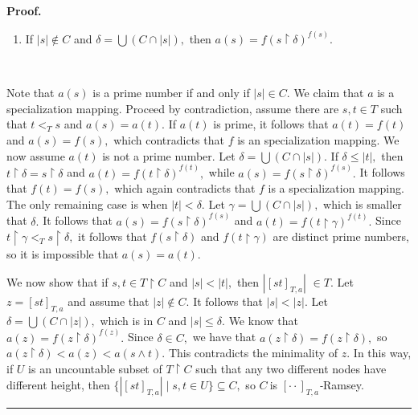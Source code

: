 \documentclass{article}
\newenvironment{proof}[1][Proof]{\noindent\textbf{#1.} }{\ \rule{0.5em}{0.5em}}
\begin{document}
\begin{proof}
\begin{enumerate}
\item If $\left\vert s\right\vert \notin C$ and $\delta=\bigcup\left(
C\cap\left\vert s\right\vert \right)  ,$ then $a\left(  s\right)  =f\left(
s\upharpoonright\delta\right)  ^{f\left(  s\right)  }.$
\end{enumerate}

\qquad\ \ 

Note that $a\left(  s\right)  $ is a prime number if and only if $\left\vert
s\right\vert \in C$. We claim that $a$ is a specialization mapping. Proceed by
contradiction, assume there are $s,t\in T$ such that $t<_{T}s$ and $a\left(
s\right)  =a\left(  t\right)  .$ If $a\left(  t\right)  $ is prime, it follows
that $a\left(  t\right)  =f\left(  t\right)  $ and $a\left(  s\right)
=f\left(  s\right)  ,$ which contradicts that $f$ is an specialization
mapping. We now assume $a\left(  t\right)  $ is not a prime number. Let
$\delta=\bigcup\left(  C\cap\left\vert s\right\vert \right)  .$ If $\delta
\leq\left\vert t\right\vert ,$ then $t\upharpoonright\delta=s\upharpoonright
\delta$ and $a\left(  t\right)  =f\left(  t\upharpoonright\delta\right)
^{f\left(  t\right)  },$ while $a\left(  s\right)  =f\left(  s\upharpoonright
\delta\right)  ^{f\left(  s\right)  }.$ It follows that $f\left(  t\right)
=f\left(  s\right)  ,$ which again contradicts that $f$ is a specialization
mapping. The only remaining case is when $\left\vert t\right\vert <\delta.$
Let $\gamma=\bigcup\left(  C\cap\left\vert s\right\vert \right)  ,$ which is
smaller that $\delta.$ It follows that $a\left(  s\right)  =f\left(
s\upharpoonright\delta\right)  ^{f\left(  s\right)  }$ and $a\left(  t\right)
=f\left(  t\upharpoonright\gamma\right)  ^{f\left(  t\right)  }.$ Since
$t\upharpoonright\gamma<_{T}s\upharpoonright\delta,$ it follows that $f\left(
s\upharpoonright\delta\right)  $ and $f\left(  t\upharpoonright\gamma\right)
$ are distinct prime numbers, so it is impossible that $a\left(  s\right)
=a\left(  t\right)  .$

\qquad\qquad\qquad

We now show that if $s,t\in T\upharpoonright C$ and $\left\vert s\right\vert
<\left\vert t\right\vert ,$ then $|\left[  st\right]  _{T,a}|$ $\in T.$ Let
$z=\left[  st\right]  _{T,a}$ and assume that $\left\vert z\right\vert \notin
C.$ It follows that $\left\vert s\right\vert <\left\vert z\right\vert .$ Let
$\delta=\bigcup\left(  C\cap\left\vert z\right\vert \right)  ,$ which is in
$C$ and $\left\vert s\right\vert \leq\delta.$ We know that $a\left(  z\right)
=f\left(  z\upharpoonright\delta\right)  ^{f\left(  z\right)  }.$ Since
$\delta\in C,$ we have that $a\left(  z\upharpoonright\delta\right)  =f\left(
z\upharpoonright\delta\right)  ,$ so $a\left(  z\upharpoonright\delta\right)
<a\left(  z\right)  <a\left(  s\wedge t\right)  .$ This contradicts the
minimality of $z.$ In this way, if $U$ is an uncountable subset of
$T\upharpoonright C$ such that any two different nodes have different height,
then $\{|\left[  st\right]  _{T,a}|\mid s,t\in U\}\subseteq C,$ so $C\ $is
$[\cdot\cdot]_{T,a}$\emph{-}Ramsey.
\end{proof}
\end{document}

